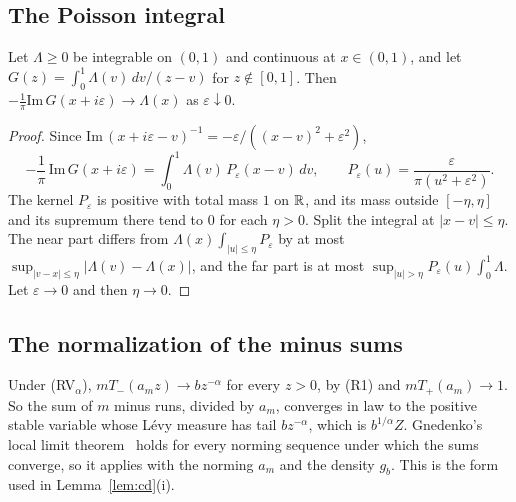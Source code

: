 \subsection{The Poisson integral}

\begin{lemma}\label{lem:poisson}
Let $\Lambda\ge0$ be integrable on $(0,1)$ and continuous at $x\in(0,1)$, and let
$G(z)=\int_0^1\Lambda(v)\,dv/(z-v)$ for $z\notin[0,1]$. Then
$-\frac1\pi\mathrm{Im}\,G(x+i\varepsilon)\to\Lambda(x)$ as $\varepsilon\downarrow0$.
\end{lemma}

\begin{proof}
Since $\mathrm{Im}\,(x+i\varepsilon-v)^{-1}=-\varepsilon/((x-v)^2+\varepsilon^2)$,
\[
 -\frac1\pi\,\mathrm{Im}\,G(x+i\varepsilon)=\int_0^1\Lambda(v)\,P_\varepsilon(x-v)\,dv,\qquad
 P_\varepsilon(u)=\frac{\varepsilon}{\pi(u^2+\varepsilon^2)} .
\]
The kernel $P_\varepsilon$ is positive with total mass $1$ on $\mathbb{R}$, and its mass outside
$[-\eta,\eta]$ and its supremum there tend to $0$ for each $\eta>0$. Split the integral at
$|x-v|\le\eta$. The near part differs from $\Lambda(x)\int_{|u|\le\eta}P_\varepsilon$ by at most
$\sup_{|v-x|\le\eta}|\Lambda(v)-\Lambda(x)|$, and the far part is at most
$\sup_{|u|>\eta}P_\varepsilon(u)\int_0^1\Lambda$. Let $\varepsilon\to0$ and then $\eta\to0$.
\end{proof}

\subsection{The normalization of the minus sums}

Under (RV$_\alpha$), $mT_\minus(a_mz)\to bz^{-\alpha}$ for every $z>0$, by (R1) and
$mT_\plus(a_m)\to1$. So the sum of $m$ minus runs, divided by $a_m$, converges in law to the
positive stable variable whose L\'evy measure has tail $bz^{-\alpha}$, which is $b^{1/\alpha}Z$.
Gnedenko's local limit theorem~\cite[Theorem~4.2.1]{ibragimovlinnik1971} holds for every
norming sequence under which the sums converge, so it applies with the norming $a_m$ and the
density $g_b$. This is the form used in Lemma~\ref{lem:cd}(i).
